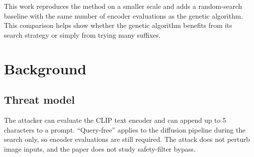 \documentclass[11pt]{article}
\DeclareMathOperator{\sgn}{sign}
\begin{document}
This work reproduces the method on a smaller scale and adds a random-search baseline with the same number of encoder evaluations as the genetic algorithm. This comparison helps show whether the genetic algorithm benefits from its search strategy or simply from trying many suffixes.

\section{Background}

\subsection{Threat model}

The attacker can evaluate the CLIP text encoder and can append up to 5 characters to a prompt. ``Query-free'' applies to the diffusion pipeline during the search only, so encoder evaluations are still required. The attack does not perturb image inputs, and the paper does not study safety-filter bypass.


\end{document}
